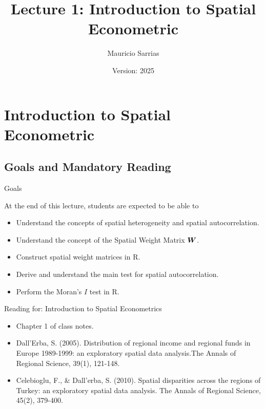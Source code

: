 \documentclass[english,10pt]{beamer}\usepackage[]{graphicx}\usepackage[]{xcolor}
\title{Lecture 1: Introduction to Spatial Econometric}
\author{Mauricio Sarrias}
\institute{Universidad de Talca}
\date{Version: 2025}
\newcommand{\pkg}[1]{{\fontseries{b}\selectfont #1}}
\begin{document}
	
	\frame{\titlepage}
	
		
		
		\frame{\tableofcontents}
		
\section{Introduction to Spatial Econometric}


\subsection{Goals and Mandatory Reading}

\begin{frame}{Goals}
\begin{alertblock}{At the end of this lecture, students are expected to be able to }
\begin{itemize}
  \item Understand the concepts of spatial heterogeneity and spatial autocorrelation. 
  \item Understand the concept of the Spatial Weight Matrix $\bm W$.
  \item Construct spatial weight matrices in \pkg{R}.
  \item Derive and understand the main test for spatial autocorrelation.
  \item Perform the Moran's $I$ test in R. 
\end{itemize}
\end{alertblock}
\end{frame}

\begin{frame}{Reading for: Introduction to Spatial Econometrics}
    \begin{itemize}
      \item Chapter 1 of class notes.
      \item Dall'Erba, S. (2005). Distribution of regional income and regional funds in Europe 1989-1999: an exploratory spatial data analysis.The Annals of Regional Science, 39(1), 121-148.
      \item Celebioglu, F., \& Dall'erba, S. (2010). Spatial disparities across the regions of Turkey: an exploratory spatial data analysis. The Annals of Regional Science, 45(2), 379-400.
    \end{itemize}
\end{frame}
\end{document}
